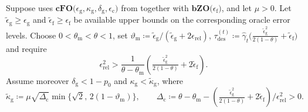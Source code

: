 \documentclass{article}
\begin{document}
\begin{assumption}
\label{ass:mu_pos_cfo_bzo}
Suppose  uses \(\textbf{cFO(}\epsilon_{\mathrm g},\kappa_{\mathrm g},\delta_{\mathrm g},\epsilon_{\mathrm c}\textbf{)}\) from  together with \(\textbf{bZO(}\epsilon_{\mathrm f}\textbf{)}\), and let \(\mu>0\).
Let \(\widetilde\epsilon_{\mathrm{g}}\ge\epsilon_{\mathrm{g}}\) and
\(\widetilde\epsilon_{\mathrm{f}}\ge\epsilon_{\mathrm{f}}\) be available upper bounds on the
corresponding oracle error levels.
Choose \(0<\theta_{\mathrm{m}}<\theta<1\), set
\(\vartheta_{\mathrm{m}}\coloneqq \widetilde\epsilon_{\mathrm{g}}/
(\widetilde\epsilon_{\mathrm{g}}+2\epsilon_{\mathrm{rel}})\), $\tau_{\mathrm{des}}^{(t)}
\coloneqq 
\hat\gamma_t
\bigl(
\tfrac{\widetilde\epsilon_{\mathrm{g}}^2}{2(1-\theta)}
+\widetilde\epsilon_{\mathrm{f}}
\bigr)$ and require
\begin{equation}\label{eq:tolerances_mu_cfo}
\epsilon_{\mathrm{rel}}^2>
\frac{1}{\theta-\theta_{\mathrm{m}}}
\left(
\tfrac{\widetilde\epsilon_{\mathrm{g}}^2}{2(1-\theta)}
+2\widetilde\epsilon_{\mathrm{f}}
\right).
\end{equation}
Assume moreover $\delta_{\mathrm{g}}<1-p_0$ and
$\kappa_{\mathrm{g}}<\widetilde\kappa_{\mathrm{g}}$, where
\[
\widetilde\kappa_{\mathrm{g}}
\coloneqq 
\mu\sqrt{\Delta_{\mathrm{c}}}
\min\{\sqrt2,\,2(1-\vartheta_{\mathrm{m}})\},\qquad \Delta_{\mathrm{c}}
\coloneqq 
\theta-\theta_{\mathrm{m}}
-
\left(
\tfrac{\widetilde\epsilon_{\mathrm{g}}^2}{2(1-\theta)}
+2\widetilde\epsilon_{\mathrm{f}}
\right)/\epsilon_{\mathrm{rel}}^2>0.
\]
\end{assumption}
\end{document}
